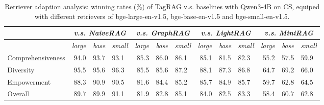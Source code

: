 \documentclass[11pt]{article}
\begin{document}


\begin{table}[t]
\centering
\small
\begin{tabular}{lrllrllrllrll}
\toprule
& \multicolumn{3}{c}{\textit{v.s. NaiveRAG}}& \multicolumn{3}{c}{\textit{v.s. GraphRAG}}& \multicolumn{3}{c}{\textit{v.s. LightRAG}}& \multicolumn{3}{c}{\textit{v.s. MiniRAG}}\\ \midrule
&\textit{large}&\textit{base}&\textit{small}&  \textit{large}& \textit{base}&\textit{small}&   \textit{large}&\textit{base}&\textit{small}& \textit{large}& \textit{base}&\textit{small}\\ \midrule
Comprehensiveness & 94.0& 93.7&93.1& 85.3& 86.0&86.1& 85.1&81.5&82.3& 55.2& 57.5&59.9\\
Diversity & 95.5& 95.6&96.3& 85.5& 85.6&87.2& 88.1&87.3&86.8& 64.7& 69.2&66.0\\
Empowerment & 88.3& 90.9&90.5& 81.6& 84.4&85.2& 85.7&84.9&85.7& 59.7& 62.8&64.5\\
Overall & 89.7& 89.9&91.1& 81.9& 82.8&85.1& 84.0&82.5&83.3& 58.4& 60.7&62.8\\
\bottomrule
\end{tabular}
\caption{Retriever adaption analysis: winning rates (\%) of TagRAG v.s. baselines with Qwen3-4B on CS, equiped with different retrievers of bge-large-en-v1.5, bge-base-en-v1.5 and bge-small-en-v1.5.}
\label{tab:retriever adaption analysis}
\end{table}
\end{document}
